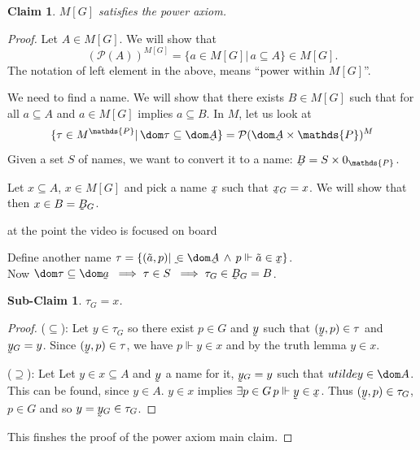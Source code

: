\documentclass[11pt,pdftex,twoside,a4paper]{article}
\newcommand{\dsP}{\ensuremath{\mathds{P}}}
\newcommand{\forces}{\ensuremath{\Vdash}}
\newcommand{\Power}{\ensuremath{\mathcal{P}}}
\newcommand{\utilde}[1]{\ensuremath{\underaccent{\tilde}{#1}}}
\newtheorem{claim}[thm]{Claim}
\newtheorem{subclaim}[thm]{Sub-Claim}
\theoremstyle{definition}
\begin{document}
\begin{claim}
\(M[G]\) satisfies the power axiom.
\end{claim}
\begin{proof}
Let \(A\in M[G]\). We will show that
\begin{equation*}
\left(\Power(A)\right)^{M[G]} = \{a\in M[G]|\, a\subseteq A\} \in M[G].
\end{equation*}
The notation of left element in the above, means ``power within \(M[G]\)''.

We need to find a name. We will show that there exists \(B\in M[G]\)
such that for all \(a\subseteq A\) and \(a\in M[G]\)
implies \(a\subseteq B\). In $M$, let us look at
\begin{equation*}
\{\tau\in M^\dsP|\,\dom\tau \subseteq \dom \utilde{A}\}
  = \Power(\dom\utilde{A}\times\dsP)^M
\end{equation*}
Given a set $S$ of names, we want to convert it to a name:
\(\utilde{B} = S\times{0_\dsP}\).

Let \(x\subseteq A\), \(x\in M[G]\) and pick a name \(\utilde{x}\)
such that \(\utilde{x}_G = x\).
We will show that then
\(x\in B = \utilde{B}_G\).

{\small at the point the video is focused on board}

Define another name
\(\tau = \{(\tilde{a},p)|\,
  \utilde\in\dom\utilde{A}\,\land\,
  p\forces \tilde{a}\in\utilde{x}\}\).\\
Now
  \(\dom \tau \subseteq \dom\utilde{a}
    \;\implies \tau \in S
    \;\implies \tau_G \in \utilde{B}_G = B\).

\begin{subclaim}
\(\tau_G = x\).
\end{subclaim}
\begin{proof}
(\(\subseteq\)): Let \(y\in\tau_G\) so there exist \(p\in G\)
and \utilde{y} such that \((\utilde{y},p)\in\tau\) and \(\utilde{y}_G=y\).
Since \((\utilde{y},p)\in\tau\), we have \(p\forces y\in x\)
and by the truth lemma \(y\in x\).

(\(\supseteq\)): Let Let \(y\in x\subseteq A\) and \utilde{y} a name for it,
\(\utilde{y}_G = y\) such that \(utilde{y}\in\dom A\).
This can be found, since \(y\in A\).
\(y\in x\) implies \(\exists p\in G\, p\forces \utilde{y}\in\utilde{x}\).
Thus \((\utilde{y},p)\in\tau_G\), \(p\in G\)
and so \(y = \utilde{y}_G\in\tau_G\).
\end{proof}

This finshes the proof of the power axiom main claim.
\end{proof}
\end{document}
